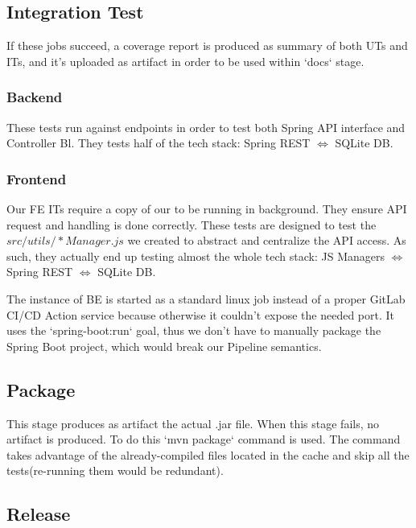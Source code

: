 \documentclass[a4paper,10pt]{scrartcl}
\begin{document}
\subsection{Integration Test}

If these jobs succeed, a coverage report is produced as summary of both UTs and ITs, and it's uploaded as artifact in order to be used within `docs` stage.

\subsubsection{Backend}

These tests run against endpoints in order to test both Spring API interface and Controller Bl. They tests half of the tech stack: Spring REST $\Leftrightarrow$ SQLite DB.

\subsubsection{Frontend}

Our FE ITs require a copy of our to be running in background. They ensure API request and handling is done correctly. These tests are designed to test the $src/utils/*Manager.js$ we created to abstract and centralize the API access. As such, they actually end up testing almost the whole tech stack: JS Managers $\Leftrightarrow$ Spring REST $\Leftrightarrow$ SQLite DB.

The instance of BE is started as a standard linux job instead of a proper GitLab CI/CD Action service because otherwise it couldn't expose the needed port. It uses the `spring-boot:run` goal, thus we don't have to manually package the Spring Boot project, which would break our Pipeline semantics.

\subsection{Package}

This stage produces as artifact the actual .jar file. When this stage fails, no artifact is produced.
To do this `mvn package` command is used. The command takes advantage of the already-compiled files located in the cache and skip all the tests(re-running them would be redundant).

\subsection{Release}
\end{document}
